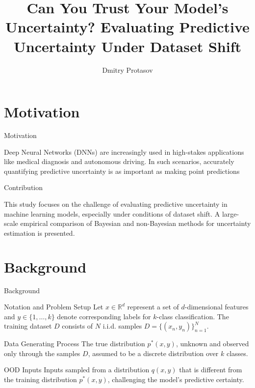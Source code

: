 \documentclass{beamer}
\title{Can You Trust Your Model’s Uncertainty? Evaluating Predictive Uncertainty Under Dataset Shift}
\author{Dmitry Protasov}
\institute{MIPT, 2023}
\begin{document}
\begin{frame}
    \titlepage
\end{frame}

\begin{frame}
    \tableofcontents
\end{frame}

\section{Motivation}
\begin{frame}{Motivation}
    \begin{block}{}
        Deep Neural Networks (DNNs) are increasingly used in high-stakes applications like medical diagnosis and autonomous driving. In such scenarios, accurately quantifying predictive uncertainty is as important as making point predictions
    \end{block}
\end{frame}

\begin{frame}{Contribution}
    \begin{block}{}
       This study focuses on the challenge of evaluating predictive uncertainty in machine learning models, especially under conditions of dataset shift. A large-scale empirical comparison of Bayesian and non-Bayesian methods for uncertainty estimation is presented. 
    \end{block}
    
\end{frame}

\section{Background}
\begin{frame}{Background}
    \begin{block}{Notation and Problem Setup}
    Let \( x \in \mathbb{R}^d \) represent a set of \( d \)-dimensional features and \( y \in \{1, \ldots, k\} \) denote corresponding labels for \( k \)-class classification. The training dataset \( D \) consists of \( N \) i.i.d. samples \( D = \{(x_n, y_n)\}_{n=1}^N \).
    \end{block}
    \begin{block}{Data Generating Process}
    The true distribution \( p^*(x, y) \), unknown and observed only through the samples \( D \), assumed to be a discrete distribution over \( k \) classes.
    \end{block}

    
    \begin{block}{OOD Inputs}
    Inputs sampled from a distribution \( q(x, y) \) that is different from the training distribution \( p^*(x, y) \), challenging the model's predictive certainty.
    \end{block}
\end{frame}
\end{document}
